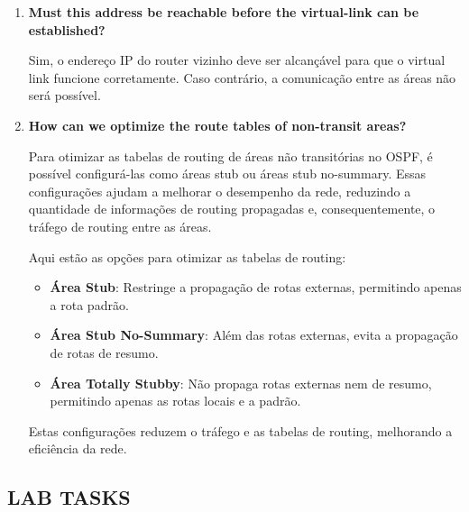\documentclass[11pt,english, openright, oneside]{book}
\begin{document}
\begin{enumerate}
  \item \textbf{Must this address be reachable before the virtual-link can be established?}
  \vspace{0.2cm}

  \par Sim, o endereço IP do router vizinho deve ser alcançável para que o virtual link funcione corretamente. Caso contrário, a comunicação entre as áreas não será possível.
  \vspace{0.2cm}

  \item \textbf{How can we optimize the route tables of non-transit areas?}
  \vspace{0.2cm}

  \par Para otimizar as tabelas de routing de áreas não transitórias no OSPF, é possível configurá-las como áreas stub ou áreas stub no-summary. Essas configurações ajudam a melhorar o desempenho da rede, reduzindo a quantidade de informações de routing propagadas e, consequentemente, o tráfego de routing entre as áreas.

  \par Aqui estão as opções para otimizar as tabelas de routing:
  \vspace{0.2cm}

  \begin{itemize}
    \item \textbf{Área Stub}: Restringe a propagação de rotas externas, permitindo apenas a rota padrão.
    \item \textbf{Área Stub No-Summary}: Além das rotas externas, evita a propagação de rotas de resumo.
    \item \textbf{Área Totally Stubby}: Não propaga rotas externas nem de resumo, permitindo apenas as rotas locais e a padrão.
  \end{itemize}
  \vspace{0.2cm}

  \par Estas configurações reduzem o tráfego e as tabelas de routing, melhorando a eficiência da rede.
  \vspace{0.2cm}
  \end{enumerate}

\newpage
\subsection{LAB TASKS}
\vspace{0.2cm}
\end{document}
